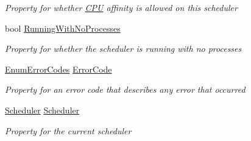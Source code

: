 \begin{DoxyCompactItemize}
\begin{DoxyCompactList}\small\item\em Property for whether \hyperlink{namespace_c_p_u___o_s___simulator_1_1_c_p_u}{C\+P\+U} affinity is allowed on this scheduler \end{DoxyCompactList}\item 
bool \hyperlink{class_c_p_u___o_s___simulator_1_1_operating___system_1_1_o_s_core_a1f01594c8f33961b5dc5ffffaf7644ce}{Running\+With\+No\+Processes}
\begin{DoxyCompactList}\small\item\em Property for whether the scheduler is running with no processes \end{DoxyCompactList}\item 
\hyperlink{namespace_c_p_u___o_s___simulator_1_1_operating___system_aea0b669d1bbf5690ae34ac2f8bef9470}{Enum\+Error\+Codes} \hyperlink{class_c_p_u___o_s___simulator_1_1_operating___system_1_1_o_s_core_a77a647e293c14574919b144cb2e8998f}{Error\+Code}
\begin{DoxyCompactList}\small\item\em Property for an error code that describes any error that occurred \end{DoxyCompactList}\item 
\hyperlink{class_c_p_u___o_s___simulator_1_1_operating___system_1_1_scheduler}{Scheduler} \hyperlink{class_c_p_u___o_s___simulator_1_1_operating___system_1_1_o_s_core_aa97bbf90ba03bd17c02f889189108455}{Scheduler}
\begin{DoxyCompactList}\small\item\em Property for the current scheduler \end{DoxyCompactList}\end{DoxyCompactItemize}

